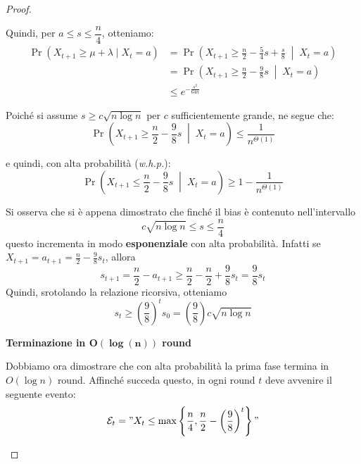 \begin{teorema}
\begin{proof}
\begin{description}
            Quindi, per $a \leq s \leq \dfrac{n}{4}$, otteniamo:
            \begin{align*}
            \Pr\!\left(X_{t+1} \geq \mu + \lambda \mid X_t = a\right)
                &= \Pr\!\left(X_{t+1} \geq \frac{n}{2} - \frac{5}{4}s + \frac{s}{8}
                \;\middle|\; X_t = a\right) \\
                &= \Pr\!\left(X_{t+1} \geq \frac{n}{2} - \frac{9}{8}s
                \;\middle|\; X_t = a\right) \\
                &\leq e^{-\frac{s^2}{64n}}
            \end{align*}

            Poiché si assume $s \geq c\sqrt{n \log n}$ per $c$ sufficientemente grande, ne segue che:
            \[
                \Pr\!\left(X_{t+1} \geq \frac{n}{2} - \frac{9}{8}s \;\middle|\; X_t = a\right)
                \leq \frac{1}{n^{\Theta(1)}}
            \]

            e quindi, con alta probabilità (\textit{w.h.p.}):
            \[
                \Pr\!\left(X_{t+1} \leq \frac{n}{2} - \frac{9}{8}s \;\middle|\; X_t = a\right)
                \geq 1 - \frac{1}{n^{\Theta(1)}}
            \]

            Si osserva che si è appena dimostrato che finché il bias è contenuto nell'intervallo
            \[
                c\sqrt{n \log n} \leq s \leq \frac{n}{4}
            \]
            questo incrementa in modo \textbf{esponenziale} con alta probabilità. Infatti se $X_{t+1} = a_{t+1} = \frac{n}{2} - \frac{9}{8}s_t$, allora
            \[
                s_{t+1} = \frac{n}{2} - a_{t+1} \geq \frac{n}{2} - \frac{n}{2} + \frac{9}{8}s_t =\frac{9}{8}s_t 
            \]
            Quindi, srotolando la relazione ricorsiva, otteniamo
            \[
                s_t \geq \left(\frac{9}{8}\right)^t s_0 = \left(\frac{9}{8}\right)c\sqrt{n \log n}
            \]

            \textbf{Terminazione in $\mathbf{O(\log(n))}$ round}

            Dobbiamo ora dimostrare che con alta probabilità la prima fase termina in $O(\log n)$ round. Affinché succeda questo, in ogni round $t$ deve avvenire il seguente evento:
            \[
                \mathcal{E}_t = "X_t \leq \max \left\{ \frac{n}{4}, \frac{n}{2} - \left( \frac{9}{8} \right)^t \right\}"
            \]


\end{description}
\end{proof}
\end{teorema}
